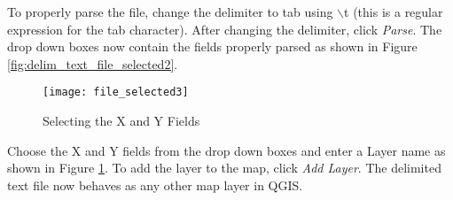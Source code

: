 To properly parse the file, change the delimiter to
tab using \mbox{$\backslash$}t (this is a regular expression for the tab
character). After changing the delimiter, click {\em Parse}.
The drop down boxes now contain the fields properly parsed as shown in Figure
\ref{fig:delim_text_file_selected2}.

\begin{figure}[ht]
   \begin{center}
   \caption{Selecting the X and Y
Fields}\label{fig:delim_text_file_selected3}\smallskip
\texttt{[image: file\_selected3]}
   \end{center}  
\end{figure}

Choose the X and Y fields from the drop
down boxes and enter a Layer name as shown in Figure
\ref{fig:delim_text_file_selected3}. To add the layer to the
map, click {\em Add Layer}. The delimited text file now behaves as any other
map layer in QGIS.

